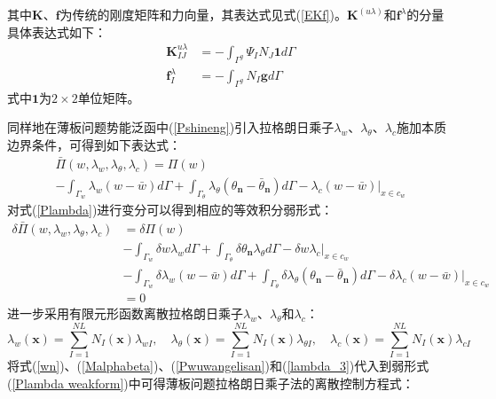 其中$\pmb{K}$、$\pmb{f}$为传统的刚度矩阵和力向量，其表达式见式(\ref{EKf})。$\pmb{K}^{(u\lambda)}$和$\pmb{f}^{\lambda}$的分量具体表达式如下：
\begin{subequations}
\begin{align}
    \pmb K_{IJ}^{u\lambda}&=-\int_{\Gamma^g}\Psi_IN_J \boldsymbol 1d\Gamma\\
    \pmb f_I^{\lambda}&=-\int_{\Gamma^g}N_I\pmb{g}d\Gamma
\end{align}
\end{subequations}
式中$\boldsymbol 1$为$2\times2$单位矩阵。
\par
同样地在薄板问题势能泛函中(\ref{Pshineng})引入拉格朗日乘子$\lambda_w$、$\lambda_\theta$、$\lambda_c$施加本质边界条件，可得到如下表达式：
\begin{multline}\label{Plambda}
    \bar{\Pi}(w,\lambda_w,\lambda_{\theta},\lambda_c)=\Pi(w) \\ -\int_{\Gamma_w}\lambda_w(w-\bar{w})d\Gamma
    +\int_{\Gamma_{\theta}}\lambda_{\theta}(\theta_{\pmb n}-\bar{\theta}_{\pmb n})d\Gamma
    -\lambda_c(w-\bar{w})\vert_{x\in c_w}
\end{multline}
对式(\ref{Plambda})进行变分可以得到相应的等效积分弱形式：
\begin{equation}\label{Plambda weakform}
\begin{split}
    \delta\bar{\Pi}(w,\lambda_w,\lambda_{\theta},\lambda_c)&=\delta\Pi(w)\\
    &-\int_{\Gamma_w}\delta w\lambda_wd\Gamma+\int_{\Gamma_{\theta}}\delta\theta_{\pmb n}\lambda_\theta d\Gamma-\delta w\lambda_c\vert_{x\in c_w}\\
    &-\int_{\Gamma_w}\delta\lambda_w(w-\bar{w})d\Gamma+\int_{\Gamma_{\theta}}\delta\lambda_\theta(\theta_{\pmb n}-\bar{\theta}_{\pmb n})d\Gamma-\delta\lambda_c(w-\bar{w})\vert_{x\in c_w}\\
    &=0
\end{split}
\end{equation}
进一步采用有限元形函数离散拉格朗日乘子$\lambda_w$、$\lambda_\theta$和$\lambda_c$：
\begin{equation}\label{lambda_3}
\lambda_w(\pmb{x})=\sum_{I=1}^{N\!L}N_I(\pmb{x})\lambda_{wI},\quad
\lambda_\theta(\pmb{x})=\sum_{I=1}^{N\!L}N_I(\pmb{x})\lambda_{\theta I},\quad
\lambda_c(\pmb{x})=\sum_{I=1}^{N\!L}N_I(\pmb{x})\lambda_{cI}
\end{equation}
将式(\ref{wn})、(\ref{Malphabeta})、(\ref{Pwuwangelisan})和(\ref{lambda_3})代入到弱形式(\ref{Plambda weakform})中可得薄板问题拉格朗日乘子法的离散控制方程式：
